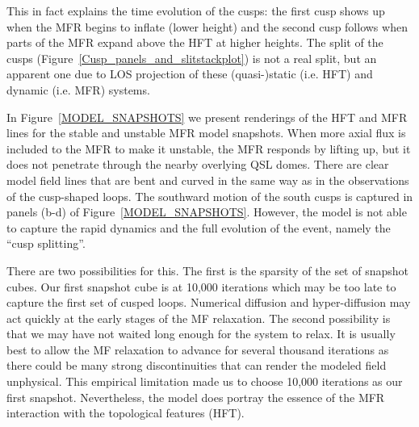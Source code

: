 \documentclass[preprint]{aastex}
\begin{document}
This in fact explains the time evolution of the cusps: the first cusp shows up when the MFR begins to inflate (lower height) and the second cusp follows when parts of the MFR expand above the HFT at higher heights. The split of the cusps (Figure~\ref{Cusp_panels_and_slitstackplot}) is not a real split, but an apparent one due to LOS projection of these (quasi-)static (i.e. HFT) and dynamic (i.e. MFR) systems.


In Figure~\ref{MODEL_SNAPSHOTS} we present renderings of the HFT and MFR lines for the stable and unstable MFR model snapshots. When more axial flux is included to the MFR to make it unstable, the MFR responds by lifting up, but it does not penetrate through the nearby overlying QSL domes. There are clear model field lines that are bent and curved in the same way as in the observations of the cusp-shaped loops. The southward motion of the south cusps is captured in panels (b-d) of Figure~\ref{MODEL_SNAPSHOTS}. However, the model is not able to capture the rapid dynamics and the full evolution of the event, namely the ``cusp splitting''. 

There are two possibilities for this. The first is the sparsity of the set of snapshot cubes. Our first snapshot cube is at 10,000 iterations which may be too late to capture the first set of cusped loops. Numerical diffusion and hyper-diffusion may act quickly at the early stages of the MF relaxation. The second possibility is that we may have not waited long enough for the system to relax. It is usually best to allow the MF relaxation to advance for several thousand iterations as there could be many strong discontinuities that can render the modeled field unphysical. This empirical limitation made us to choose 10,000 iterations as our first snapshot. Nevertheless, the model does portray the essence of the MFR interaction with the topological features (HFT).

\begin{figure*}
\caption{Overview of the stable and unstable MFR models with selected field lines from two viewpoints (top row panels: Earth view, bottom row: top view). High log$_{10}$Q-factor values (volumetric rendering in 3D) show the two intersecting QSLs (QSL1 and QSL2) creating the hyperbolic flux tube (HFT) oriented along the N-S. Close to the surface the QSLs roughly correspond to the locations of the flare ribbons (bottom panels (e-h)). The first column (panels (a) and (e)) shows the stable model after 40,000 iterations where it converged. The rest of the columns show the unstable modelled MFR at three snapshots during its evolution (10,000, 20,000, and 30,000 iterations respectively). The selected field lines show MFR field lines that exhibit the ``cusp'' morphology. Note that as the time proceeds the ``cusp'' fieldlines move southward as in the observations.
}
\label{MODEL_SNAPSHOTS}
\end{figure*}
\end{document}
